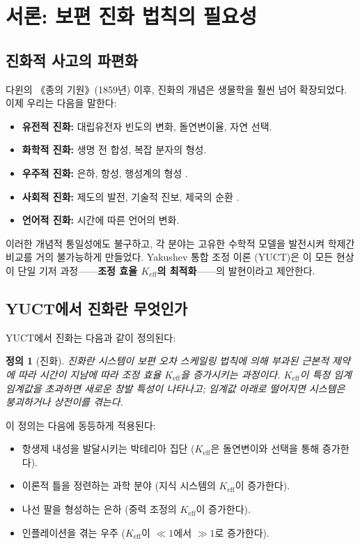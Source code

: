 \documentclass[12pt,a4paper]{article}
\newcommand{\Keff}{K_{\mathrm{eff}}}
\newtheorem{definition}[theorem]{정의}
\theoremstyle{remark}
\begin{document}
	\tableofcontents
	\newpage
	
	\section{서론: 보편 진화 법칙의 필요성}
	
	\subsection{진화적 사고의 파편화}
	
	다윈의 《종의 기원》(1859년) \cite{Darwin1859} 이후, 진화의 개념은 생물학을 훨씬 넘어 확장되었다. 이제 우리는 다음을 말한다:
	
	\begin{itemize}
		\item \textbf{유전적 진화:} 대립유전자 빈도의 변화, 돌연변이율, 자연 선택.
		\item \textbf{화학적 진화:} 생명 전 합성, 복잡 분자의 형성.
		\item \textbf{우주적 진화:} 은하, 항성, 행성계의 형성 \cite{Chaisson2001}.
		\item \textbf{사회적 진화:} 제도의 발전, 기술적 진보, 제국의 순환 \cite{Boulding1978}.
		\item \textbf{언어적 진화:} 시간에 따른 언어의 변화.
	\end{itemize}
	
	이러한 개념적 통일성에도 불구하고, 각 분야는 고유한 수학적 모델을 발전시켜 학제간 비교를 거의 불가능하게 만들었다. Yakushev 통합 조정 이론 (YUCT)은 이 모든 현상이 단일 기저 과정——\textbf{조정 효율 \(\Keff\)의 최적화}——의 발현이라고 제안한다.
	
	\subsection{YUCT에서 진화란 무엇인가}
	
	YUCT에서 진화는 다음과 같이 정의된다:
	
	\begin{definition}[진화]
		진화란 시스템이 보편 오차 스케일링 법칙에 의해 부과된 근본적 제약에 따라 시간이 지남에 따라 조정 효율 \(\Keff\)을 증가시키는 과정이다. \(\Keff\)이 특정 임계 임계값을 초과하면 새로운 창발 특성이 나타나고; 임계값 아래로 떨어지면 시스템은 붕괴하거나 상전이를 겪는다.
	\end{definition}
	
	이 정의는 다음에 동등하게 적용된다:
	
	\begin{itemize}
		\item 항생제 내성을 발달시키는 박테리아 집단 (\(\Keff\)은 돌연변이와 선택을 통해 증가한다).
		\item 이론적 틀을 정련하는 과학 분야 (지식 시스템의 \(\Keff\)이 증가한다).
		\item 나선 팔을 형성하는 은하 (중력 조정의 \(\Keff\)이 증가한다).
		\item 인플레이션을 겪는 우주 (\(\Keff\)이 \(\ll 1\)에서 \(\gg 1\)로 증가한다).
	\end{itemize}
	
\end{document}
